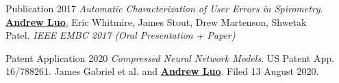 \begin{cventries}
  \vspace{-0.5em}
  \cventry
    {Publication}
    {}
    {}
    {2017}
    {
    \textit{Automatic Characterization of User Errors in Spirometry}. \underline{\textbf{Andrew Luo}}, Eric Whitmire,
 James Stout, Drew Martenson, Shwetak \textcolor{white}{aaaaa} Patel. \textit{IEEE} \textit{EMBC 2017 (Oral Presentation + Paper)}}
  \vspace{-0.17em}
\end{cventries}

\begin{cventries}
  \vspace{-0.17em}
  \cventry
    {Patent Application}
    {}
    {}
    {2020}
    {
    \textit{Compressed Neural Network Models}. US Patent App. 16/788261. James Gabriel et al. and \underline{\textbf{Andrew Luo}}. Filed 13 August 2020.}
  \vspace{-0.5em}
\end{cventries}